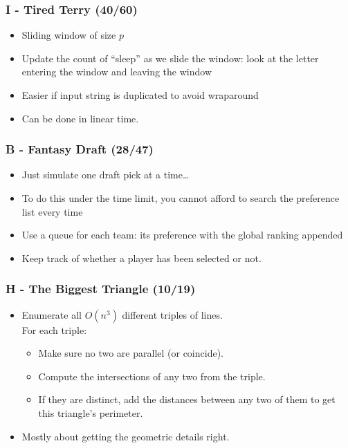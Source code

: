 \documentclass{beamer}
\begin{document}
\begin{frame}
\frametitle{I - Tired Terry (40/60)}
\begin{itemize}
\setlength\itemsep{0.5\baselineskip}
\item Sliding window of size $p$
\item Update the count of ``sleep'' as we slide the window: look at
  the letter entering the window and leaving the window
\item Easier if input string is duplicated to avoid wraparound
\item Can be done in linear time.
\end{itemize}
\end{frame}

\begin{frame}
\frametitle{B - Fantasy Draft (28/47)}
\begin{itemize}
  \setlength\itemsep{0.5\baselineskip}
\item Just simulate one draft pick at a time\ldots
\item To do this under the time limit, you cannot afford to search the
  preference list every time
\item Use a queue for each team: its preference with the global ranking
  appended
\item Keep track of whether a player has been selected or not.
\end{itemize}
\end{frame}

\begin{frame}
\frametitle{H - The Biggest Triangle (10/19)}
\begin{itemize}
\setlength\itemsep{0.5\baselineskip}
\item Enumerate all $O(n^3)$ different triples of lines.\\
For each triple:
\begin{itemize}
\item Make sure no two are parallel (or coincide).
\item Compute the intersections of any two from the triple.
\item If they are distinct, add the distances between any two of them to get this triangle's perimeter.
\end{itemize}
\item Mostly about getting the geometric details right.
\end{itemize}
\end{frame}
\end{document}
